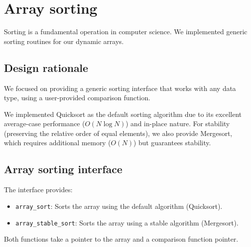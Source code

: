 \chapter{Array sorting}\label{chap:sorting}

Sorting is a fundamental operation in computer science. We implemented generic sorting routines for our dynamic arrays.

\section{Design rationale}

We focused on providing a generic sorting interface that works with any data type, using a user-provided comparison function.

We implemented Quicksort as the default sorting algorithm due to its excellent average-case performance ($O(N \log N)$) and in-place nature. For stability (preserving the relative order of equal elements), we also provide Mergesort, which requires additional memory ($O(N)$) but guarantees stability.

\section{Array sorting interface}

The interface provides:
\begin{itemize}
    \item \texttt{array\_sort}: Sorts the array using the default algorithm (Quicksort).
    \item \texttt{array\_stable\_sort}: Sorts the array using a stable algorithm (Mergesort).
\end{itemize}

Both functions take a pointer to the array and a comparison function pointer.
